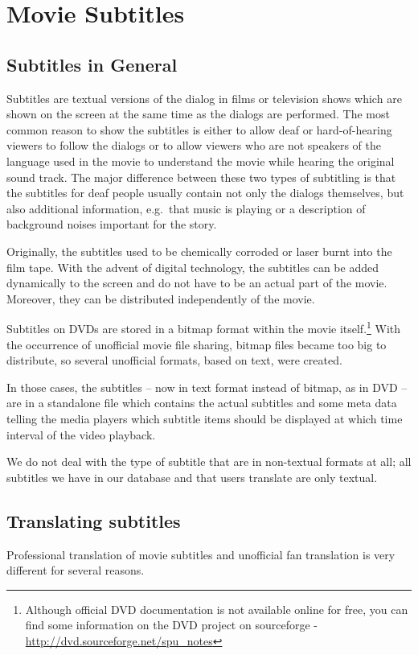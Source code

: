 \section{Movie Subtitles}
\subsection{Subtitles in General}

Subtitles are textual versions of the dialog in films or television shows which are shown on the screen at the same time as the dialogs are performed. The most common reason to show the subtitles is either to allow deaf or hard-of-hearing viewers to follow the dialogs or to allow viewers who are not speakers of the language used in the movie to understand the movie while hearing the original sound track. The major difference between these two types of subtitling is that the subtitles for deaf people usually contain not only the dialogs themselves, but also additional information, e.g.\ that music is playing or a description of background noises important for the story.

Originally, the subtitles used to be chemically corroded or laser burnt into the film tape. With the advent of digital technology, the subtitles can be added dynamically to the screen and do not have to be an actual part of the movie. Moreover, they can be distributed independently of the movie.

Subtitles on DVDs are stored in a bitmap format within the movie itself.\footnote{Although official DVD documentation is not available online for free, you can find some information on the DVD project on sourceforge - \url{http://dvd.sourceforge.net/spu_notes}} With the occurrence of unofficial movie file sharing, bitmap files became too big to distribute, so several unofficial formats, based on text, were created.

In those cases, the subtitles -- now in text format instead of bitmap, as in DVD -- are in a standalone file which contains the actual subtitles and some meta data telling the media players which subtitle items should be displayed at which time interval of the video playback.

We do not deal with the type of subtitle that are in non-textual formats at all; all subtitles we have in our database and that users translate are only textual.

\subsection{Translating subtitles}
Professional translation of movie subtitles and unofficial fan translation is very different for several reasons.

